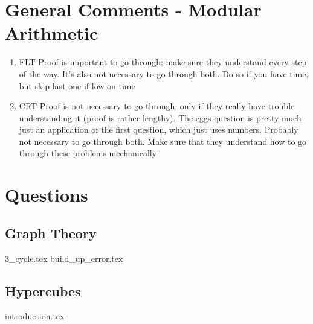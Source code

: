 \documentclass{exam}
\begin{document}
\section{General Comments - Modular Arithmetic}
\begin{enumerate}
\item FLT Proof is important to go through; make sure they understand every step of the way. It's also not necessary to go through both. Do so if you have time, but skip last one if low on time
\item CRT Proof is not necessary to go through, only if they really have trouble understanding it (proof is rather lengthy). The eggs question is pretty much just an application of the first question, which just uses numbers. Probably not necessary to go through both. Make sure that they understand how to go through these problems mechanically
\end{enumerate}


\clearpage 

\section{Questions}
\subsection{Graph Theory}
\begin{enumerate}
{3_cycle.tex}
{build_up_error.tex}
\end{enumerate}

\subsection{Hypercubes}
\begin{enumerate}
{introduction.tex}
\end{enumerate}
\end{document}
